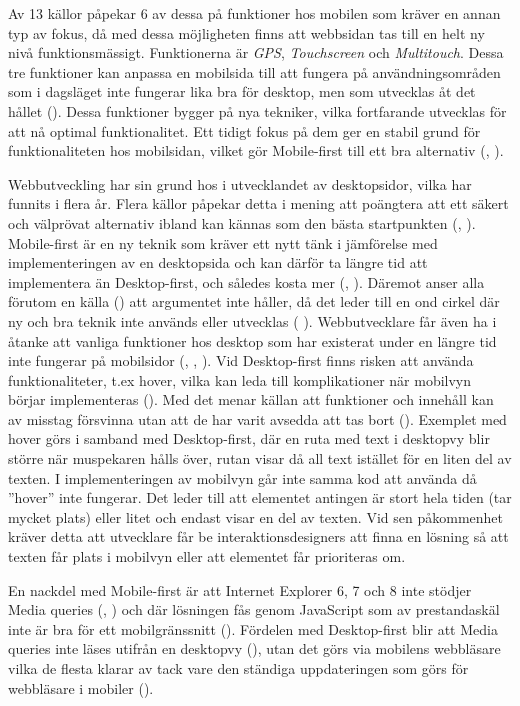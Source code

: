 \documentclass[11pt]{article}
\begin{document}
Av 13 källor påpekar 6 av dessa på funktioner hos mobilen som kräver en annan typ av fokus, då med dessa möjligheten finns att webbsidan tas till en helt ny nivå funktionsmässigt. Funktionerna är \textit{GPS}, \textit{Touchscreen} och \textit{Multitouch}. Dessa tre funktioner kan anpassa en mobilsida till att fungera på användningsområden som i dagsläget inte fungerar lika bra för desktop, men som utvecklas åt det hållet (\cite{sweclock}). Dessa funktioner bygger på nya tekniker, vilka fortfarande utvecklas för att nå optimal funktionalitet. Ett tidigt fokus på dem ger en stabil grund för funktionaliteten hos mobilsidan, vilket gör Mobile-first till ett bra alternativ (\cite{techradar}, \cite{othermedia}).
 
Webbutveckling har sin grund hos i utvecklandet av desktopsidor, vilka har funnits i flera år. Flera källor påpekar detta i mening att poängtera att ett säkert och välprövat alternativ ibland kan kännas som den bästa startpunkten (\cite{armstrong}, \cite{readyartwork}). Mobile-first är en ny teknik som kräver ett nytt tänk i jämförelse med implementeringen av en desktopsida och kan därför ta längre tid att implementera än Desktop-first, och således kosta mer (\cite{readyartwork}, \cite{marcuspope}). Däremot anser alla förutom en källa (\cite{armstrong}) att argumentet inte håller, då det leder till en ond cirkel där ny och bra teknik inte används eller utvecklas (\cite{designshack} \cite{marcuspope}). Webbutvecklare får även ha i åtanke att vanliga funktioner hos desktop som har existerat under en längre tid inte fungerar på mobilsidor (\cite{responsivedesign}, \cite{designshack}, \cite{webinsation}). Vid Desktop-first finns risken att använda funktionaliteter, t.ex hover, vilka kan leda till komplikationer när mobilvyn börjar implementeras (\cite{readyartwork}). Med det menar källan att funktioner och innehåll kan av misstag försvinna utan att de har varit avsedda att tas bort (\cite{readyartwork}). Exemplet med hover görs i samband med Desktop-first, där en ruta med text i desktopvy blir större när muspekaren hålls över, rutan visar då all text istället för en liten del av texten. I implementeringen av mobilvyn går inte samma kod att använda då ”hover” inte fungerar. Det leder till att elementet antingen är stort hela tiden (tar mycket plats) eller litet och endast visar en del av texten. Vid sen påkommenhet kräver detta att utvecklare får be interaktionsdesigners att finna en lösning så att texten får plats i mobilvyn eller att elementet får prioriteras om.
 
En nackdel med Mobile-first är att Internet Explorer 6, 7 och 8 inte stödjer Media queries (\cite{marcuspope}, \cite{neocreo}) och där lösningen fås genom JavaScript som av prestandaskäl inte är bra för ett mobilgränssnitt (\cite{responsivedesign}). Fördelen med Desktop-first blir att Media queries inte läses utifrån en desktopvy (\cite{neocreo}), utan det görs via mobilens webbläsare vilka de flesta klarar av tack vare den ständiga uppdateringen som görs för webbläsare i mobiler (\cite{webinsation}).
 
\end{document}
